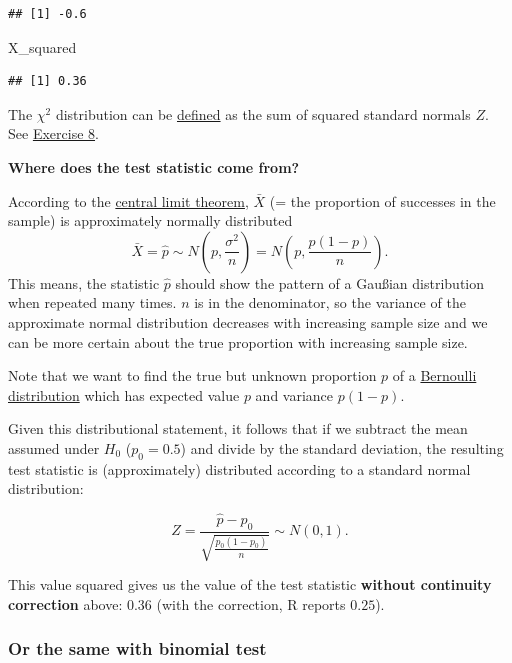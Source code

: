 \documentclass[
]{book}
\newenvironment{Shaded}{\begin{snugshade}}{\end{snugshade}}
\newcommand{\NormalTok}[1]{#1}
\begin{document}
\begin{verbatim}
## [1] -0.6
\end{verbatim}

\begin{Shaded}
\begin{Highlighting}[]
\NormalTok{X\_squared}
\end{Highlighting}
\end{Shaded}

\begin{verbatim}
## [1] 0.36
\end{verbatim}

The \(\chi^2\) distribution can be \href{https://en.wikipedia.org/wiki/Chi-squared_distribution\#Definitions}{defined}
as the sum of squared standard normals \(Z\). See \hyperref[exercise8_nhst]{Exercise 8}.

\textbf{Where does the test statistic come from?}

According to the \href{https://en.wikipedia.org/wiki/Central_limit_theorem}{central limit theorem},
\(\bar{X}\) (= the proportion of successes in the sample) is approximately normally distributed\\
\[\bar{X} = \hat{p} \sim N(p, \frac{\sigma^2}{n}) = N(p, \frac{p(1-p)}{n}).\]
This means, the statistic \(\hat{p}\) should show the pattern of a Gaußian distribution when repeated many times.
\(n\) is in the denominator, so the variance of the approximate normal distribution decreases with increasing sample size and we
can be more certain about the true proportion with increasing sample size.

Note that we want to find the true but unknown proportion \(p\) of a
\href{https://en.wikipedia.org/wiki/Bernoulli_distribution}{Bernoulli distribution} which has expected value \(p\) and variance \(p(1-p)\).

Given this distributional statement, it follows that if we subtract the mean assumed under \(H_0\) (\(p_0 = 0.5\)) and divide by the standard deviation,
the resulting test statistic is (approximately) distributed according to a standard normal distribution:

\[Z = \frac{\hat{p} - p_0}{\sqrt{\frac{p_0(1-p_0)}{n}}} \sim N(0, 1).\]

This value squared gives us the value of the test statistic \textbf{without continuity correction} above: \(0.36\) (with the correction, R reports \(0.25\)).

\subsubsection{Or the same with binomial test}\label{or-the-same-with-binomial-test}
\end{document}

